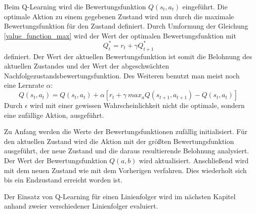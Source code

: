 Beim Q-Learning wird die Bewertungsfunktion $Q(s_t, a_t)$ eingeführt. Die optimale Aktion zu einem gegebenen Zustand wird nun durch die maximale Bewertungsfunktion für den Zustand definiert. Durch Umformung der Gleichung \ref{value_function_max} wird der Wert der optimalen Bewertungsfunktion mit
\begin{equation}
	Q^{*}_t = r_t + \gamma Q^{*}_{t+1}
\end{equation} 
definiert. Der Wert der aktuellen Bewertungsfunktion ist somit die Belohnung des aktuellen Zustandes und der Wert der abgeschwächten Nachfolgezustandsbewertungsfunktion. Des Weiteren benutzt man meist noch eine Lernrate $\alpha$:
\begin{equation}
	Q(s_t, a_t) = Q(s_t, a_t) + \alpha[r_t + \gamma \ max_a Q(s_{t+1}, a_{t+1}) - Q(s_t, a_t)]
\end{equation}
Durch $\epsilon$ wird mit einer gewissen Wahrscheinlichkeit nicht die optimale, sondern eine zufällige Aktion, ausgeführt. \cite{Ertel_2013}\par
Zu Anfang werden die Werte der Bewertungsfunktionen zufällig initialisiert. Für den aktuellen Zustand wird die Aktion mit der größten Bewertungsfunktion ausgeführt, der neue Zustand und die daraus resultierende Belohnung analysiert. Der Wert der Bewertungsfunktion $Q(a, b)$ wird aktualisiert. Anschließend wird mit dem neuen Zustand wie mit dem Vorherigen verfahren. Dies wiederholt sich bis ein Endzustand erreicht worden ist. \cite{Ertel_2013}\par
Der Einsatz von Q-Learning für einen Linienfolger wird im nächsten Kapitel anhand zweier verschiedener Linienfolger evaluiert.

